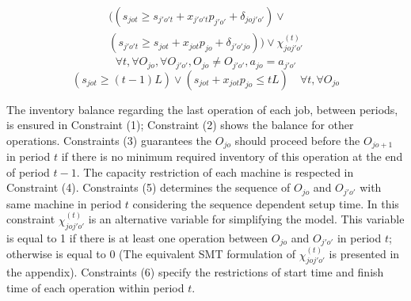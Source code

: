\documentclass[letterpaper]{article} %
\begin{document}
\fi
\begin{multline}
\Big( (s_{jot} \geq s_{j'o't} + x_{j'o't} p_{j'o'}+ \delta_{joj'o'}) \vee
\\
(s_{j'o't}\geq s_{jot} + x_{jot} p_{jo} + \delta_{j'o'jo}) \Big)\vee\chi_{joj'o'}^{(t)}
\end{multline}
$$\forall t, \forall O_{jo}, \forall O_{j'o'},
O_{jo}\neq O_{j'o'},a_{jo}=a_{j'o'}$$
\begin{equation}
(s_{jot} \geq (t-1)L) \vee  (s_{jot}+x_{jot}p_{jo} \leq tL) \quad  \forall t, \forall O_{jo}
\end{equation}

The inventory balance regarding the last operation of each job, between periods, is ensured in Constraint (1); Constraint (2) shows the balance for other operations. Constraints (3) guarantees the $O_{jo}$ should proceed before the $O_{jo+1}$ in period $t$ if there is no minimum required inventory of this operation at the end of period $t-1$. The capacity restriction of each machine is respected in Constraint (4). Constraints (5) determines the sequence of $O_{jo}$ and $O_{j'o'}$ with same machine in period $t$ considering the sequence dependent setup time. In this constraint $\chi_{joj'o'}^{(t)}$ is an alternative variable for simplifying the model. This variable is equal to 1 if there is at least one operation between $O_{jo}$ and $O_{j'o'}$ in period $t$; otherwise is equal to 0 (The equivalent SMT formulation of $\chi_{joj'o'}^{(t)}$ is presented in the appendix). Constraints (6) specify the restrictions of start time and finish time of each operation within period $t$.
\end{document}
